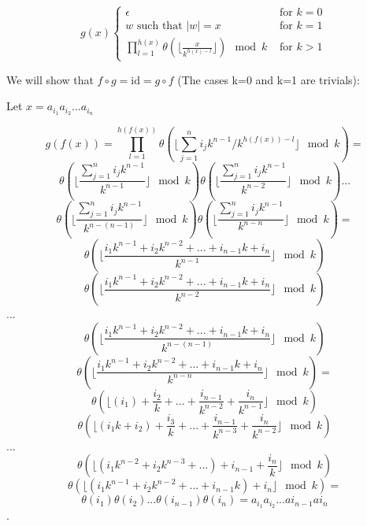 \documentclass[9pt,tikz,border=2mm]{article}
\begin{document}
\begin{enumerate}
\begin{enumerate}
                    \[  g(x)
                        \begin{cases}
                            \epsilon &\text{ for } k = 0\\
                            w \text{ such that } |w| = x &\text{ for } k=1 \\
                            \prod_{l=1}^{h(x)}\theta(\lfloor{\frac{x}{k^{h(x)-l}}}\rfloor)\mod k &\text{ for } k>1\
                        \end{cases}
                    \]

                We will show that $f \circ g =  \mathrm{id} = g \circ f$ (The cases k=0 and k=1 are trivials):\newline

                Let $x = a_{i_1}a_{i_2}...a_{i_n}$
                
                \[
                    g(f(x)) = \prod_{l=1}^{h(f(x))}\theta(\lfloor{\sum_{j=1}^n{i_jk^{n-1}}/k^{h(f(x))-l}}\rfloor \mod k) =  \]
                \[  
                \theta(\lfloor{\frac{\sum_{j=1}^n{i_jk^{n-1}}}{k^{n-1}}}\rfloor \mod k)
                \theta(\lfloor{\frac{\sum_{j=1}^n{i_jk^{n-1}}}{k^{n-2}}}\rfloor \mod k)...\]
                \[\theta(\lfloor{\frac{\sum_{j=1}^n{i_jk^{n-1}}}{k^{n-(n-1)}}}\rfloor \mod k)\theta(\lfloor{\frac{\sum_{j=1}^n{i_jk^{n-1}}}{k^{n-n}}}\rfloor \mod k) =
                \]
                \[
                \theta(\lfloor{\frac{i_1k^{n-1}+i_2k^{n-2}+...+i_{n-1}k+i_n}{k^{n-1}}}\rfloor \mod k)
                \]
                \[
                \theta(\lfloor{\frac{i_1k^{n-1}+i_2k^{n-2}+...+i_{n-1}k+i_n}{k^{n-2}}}\rfloor \mod k)
                \]...
                \[
                \theta(\lfloor{\frac{i_1k^{n-1}+i_2k^{n-2}+...+i_{n-1}k+i_n}{k^{n-(n-1)}}}\rfloor \mod k)
                \]
                \[
                \theta(\lfloor{\frac{i_1k^{n-1}+i_2k^{n-2}+...+i_{n-1}k+i_n}{k^{n-n}}}\rfloor \mod k) =
                \]
                \[
                \theta(\lfloor{(i_1) + \frac{i_2}{k}+...+\frac{i_{n-1}}{k^{n-2}}+\frac{i_n}{k^{n-1}}}\rfloor \mod k)
                \]
                \[
               \theta(\lfloor{(i_1k + i_2) + \frac{i_3{}}{k}+...+\frac{i_{n-1}}{k^{n-3}} +\frac{i_n}{k^{n-2}}}\rfloor \mod k)
                \]
                ...
                \[
                \theta(\lfloor{(i_1k^{n-2} + i_2k^{n-3} + ... )+i_{n-1} +\frac{i_n}{k}}\rfloor \mod k)
                \]
                \[
                \theta(\lfloor{(i_1k^{n-1} + i_2k^{n-2} + ... +i_{n-1}k) +i_n}\rfloor \mod k) =
                \]
                \[ \theta(i_1)\theta(i_2)...\theta(i_{n-1})\theta(i_n)  = a_{i_1}a_{i_2}...a{i_{n-1}}a{i_n}\].



\end{enumerate}
\end{enumerate}
\end{document}
